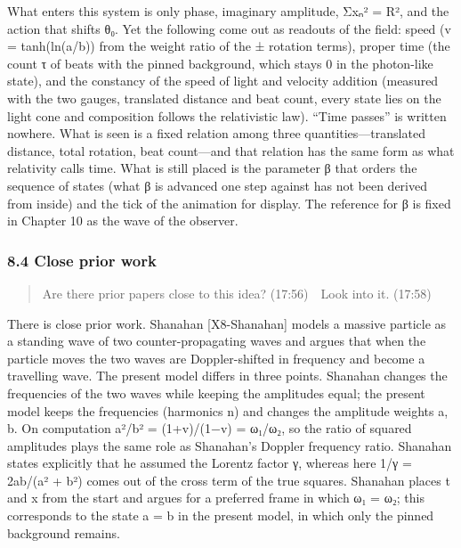 \documentclass[
  a4paper,
]{article}
\begin{document}
What enters this system is only phase, imaginary amplitude, Σxₙ² = R²,
and the action that shifts θ₀. Yet the following come out as readouts of
the field: speed (v = tanh(ln(a/b)) from the weight ratio of the ±
rotation terms), proper time (the count τ of beats with the pinned
background, which stays 0 in the photon-like state), and the constancy
of the speed of light and velocity addition (measured with the two
gauges, translated distance and beat count, every state lies on the
light cone and composition follows the relativistic law). ``Time
passes'' is written nowhere. What is seen is a fixed relation among
three quantities---translated distance, total rotation, beat count---and
that relation has the same form as what relativity calls time. What is
still placed is the parameter β that orders the sequence of states (what
β is advanced one step against has not been derived from inside) and the
tick of the animation for display. The reference for β is fixed in
Chapter 10 as the wave of the observer.

\subsubsection{8.4 Close prior work}\label{close-prior-work}

\begin{quote}
Are there prior papers close to this idea? (17:56)　Look into it.
(17:58)
\end{quote}

There is close prior work. Shanahan {[}X8-Shanahan{]} models a massive
particle as a standing wave of two counter-propagating waves and argues
that when the particle moves the two waves are Doppler-shifted in
frequency and become a travelling wave. The present model differs in
three points. Shanahan changes the frequencies of the two waves while
keeping the amplitudes equal; the present model keeps the frequencies
(harmonics n) and changes the amplitude weights a, b. On computation
a²/b² = (1+v)/(1−v) = ω₁/ω₂, so the ratio of squared amplitudes plays
the same role as Shanahan's Doppler frequency ratio. Shanahan states
explicitly that he assumed the Lorentz factor γ, whereas here 1/γ =
2ab/(a² + b²) comes out of the cross term of the true squares. Shanahan
places t and x from the start and argues for a preferred frame in which
ω₁ = ω₂; this corresponds to the state a = b in the present model, in
which only the pinned background remains.
\end{document}
